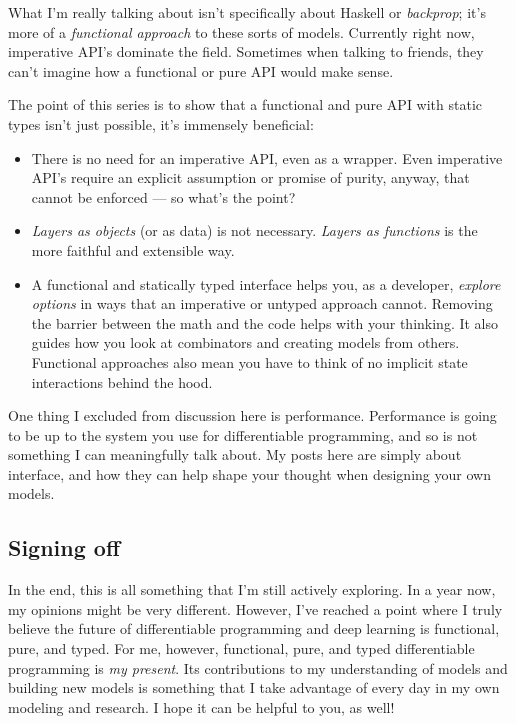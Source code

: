 \documentclass[]{article}
\begin{document}
What I'm really talking about isn't specifically about Haskell or
\emph{backprop}; it's more of a \emph{functional approach} to these sorts of
models. Currently right now, imperative API's dominate the field. Sometimes when
talking to friends, they can't imagine how a functional or pure API would make
sense.

The point of this series is to show that a functional and pure API with static
types isn't just possible, it's immensely beneficial:

\begin{itemize}
\tightlist
\item
  There is no need for an imperative API, even as a wrapper. Even imperative
  API's require an explicit assumption or promise of purity, anyway, that cannot
  be enforced --- so what's the point?
\item
  \emph{Layers as objects} (or as data) is not necessary. \emph{Layers as
  functions} is the more faithful and extensible way.
\item
  A functional and statically typed interface helps you, as a developer,
  \emph{explore options} in ways that an imperative or untyped approach cannot.
  Removing the barrier between the math and the code helps with your thinking.
  It also guides how you look at combinators and creating models from others.
  Functional approaches also mean you have to think of no implicit state
  interactions behind the hood.
\end{itemize}

One thing I excluded from discussion here is performance. Performance is going
to be up to the system you use for differentiable programming, and so is not
something I can meaningfully talk about. My posts here are simply about
interface, and how they can help shape your thought when designing your own
models.

\hypertarget{signing-off}{%
\subsection{Signing off}\label{signing-off}}

In the end, this is all something that I'm still actively exploring. In a year
now, my opinions might be very different. However, I've reached a point where I
truly believe the future of differentiable programming and deep learning is
functional, pure, and typed. For me, however, functional, pure, and typed
differentiable programming is \emph{my present}. Its contributions to my
understanding of models and building new models is something that I take
advantage of every day in my own modeling and research. I hope it can be helpful
to you, as well!
\end{document}
